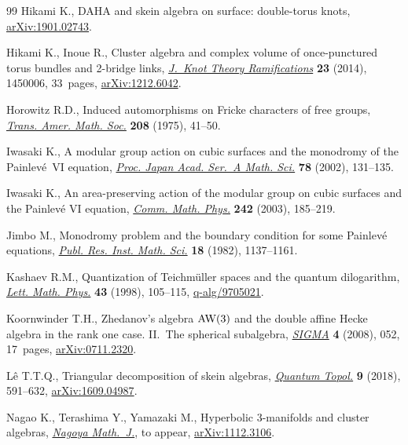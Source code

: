 \documentclass[pdftex]{sigma}
\numberwithin{equation}{section}
\begin{document}
\begin{thebibliography}{99}
Hikami K., {DAHA} and skein algebra on surface: double-torus knots,
 \href{https://arxiv.org/abs/1901.02743}{arXiv:1901.02743}.

Hikami K., Inoue R., Cluster algebra and complex volume of once-punctured torus
 bundles and 2-bridge links, \href{https://doi.org/10.1142/S0218216514500060}{\textit{J.~Knot Theory Ramifications}} \textbf{23}
 (2014), 1450006, 33~pages, \href{https://arxiv.org/abs/1212.6042}{arXiv:1212.6042}.

Horowitz R.D., Induced automorphisms on {F}ricke characters of free groups,
 \href{https://doi.org/10.2307/1997274}{\textit{Trans. Amer. Math. Soc.}} \textbf{208} (1975), 41--50.

Iwasaki K., A modular group action on cubic surfaces and the monodromy of the
 {P}ainlev\'{e}~{VI} equation, \href{https://doi.org/10.3792/pjaa.78.131}{\textit{Proc. Japan Acad. Ser.~A Math. Sci.}}
 \textbf{78} (2002), 131--135.

Iwasaki K., An area-preserving action of the modular group on cubic surfaces
 and the {P}ainlev\'{e} {VI} equation, \href{https://doi.org/10.1007/s00220-003-0940-3}{\textit{Comm. Math. Phys.}} \textbf{242}
 (2003), 185--219.

Jimbo M., Monodromy problem and the boundary condition for some {P}ainlev\'{e}
 equations, \href{https://doi.org/10.2977/prims/1195183300}{\textit{Publ. Res. Inst. Math. Sci.}} \textbf{18} (1982),
 1137--1161.

Kashaev R.M., Quantization of {T}eichm\"{u}ller spaces and the quantum
 dilogarithm, \href{https://doi.org/10.1023/A:1007460128279}{\textit{Lett. Math. Phys.}} \textbf{43} (1998), 105--115,
 \href{https://arxiv.org/abs/q-alg/9705021}{q-alg/9705021}.

Koornwinder T.H., Zhedanov's algebra {$\rm AW(3)$} and the double affine
 {H}ecke algebra in the rank one case. {II}.~{T}he spherical subalgebra,
 \href{https://doi.org/10.3842/SIGMA.2008.052}{\textit{SIGMA}} \textbf{4} (2008), 052, 17~pages, \href{https://arxiv.org/abs/0711.2320}{arXiv:0711.2320}.

L\^{e} T.T.Q., Triangular decomposition of skein algebras, \href{https://doi.org/10.4171/QT/115}{\textit{Quantum
 Topol.}} \textbf{9} (2018), 591--632, \href{https://arxiv.org/abs/1609.04987}{arXiv:1609.04987}.

Nagao K., Terashima Y., Yamazaki M., Hyperbolic 3-manifolds and cluster
 algebras, \href{https://doi.org/10.1017/nmj.2017.39}{\textit{Nagoya Math.~J.}}, {t}o appear, \href{https://arxiv.org/abs/1112.3106}{arXiv:1112.3106}.


\end{thebibliography}
\end{document}
